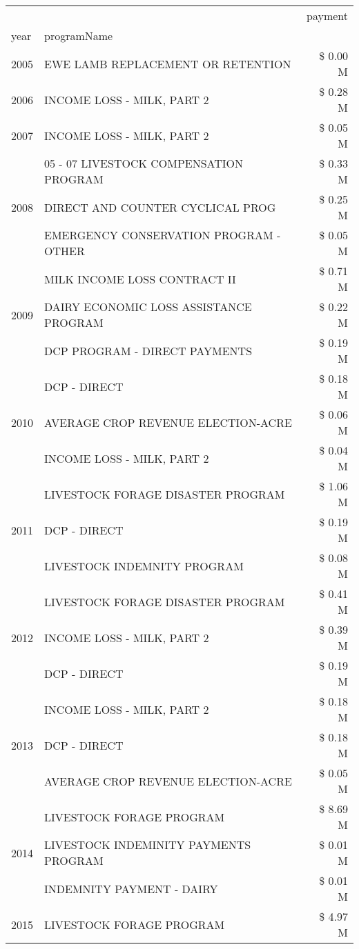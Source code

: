 \begin{tabular}{llr}
\toprule
 &  & payment \\
year & programName &  \\
\midrule
2005 & EWE LAMB REPLACEMENT OR RETENTION & \$ 0.00 M \\
\cline{1-3}
2006 & INCOME LOSS - MILK, PART 2 & \$ 0.28 M \\
\cline{1-3}
2007 & INCOME LOSS - MILK, PART 2 & \$ 0.05 M \\
\cline{1-3}
\multirow[t]{3}{*}{2008} & 05 - 07 LIVESTOCK COMPENSATION PROGRAM & \$ 0.33 M \\
 & DIRECT AND COUNTER CYCLICAL PROG & \$ 0.25 M \\
 & EMERGENCY CONSERVATION PROGRAM - OTHER & \$ 0.05 M \\
\cline{1-3}
\multirow[t]{3}{*}{2009} & MILK INCOME LOSS CONTRACT II & \$ 0.71 M \\
 & DAIRY ECONOMIC LOSS ASSISTANCE PROGRAM & \$ 0.22 M \\
 & DCP PROGRAM - DIRECT PAYMENTS & \$ 0.19 M \\
\cline{1-3}
\multirow[t]{3}{*}{2010} & DCP - DIRECT & \$ 0.18 M \\
 & AVERAGE CROP REVENUE ELECTION-ACRE & \$ 0.06 M \\
 & INCOME LOSS - MILK, PART 2 & \$ 0.04 M \\
\cline{1-3}
\multirow[t]{3}{*}{2011} & LIVESTOCK FORAGE DISASTER PROGRAM & \$ 1.06 M \\
 & DCP - DIRECT & \$ 0.19 M \\
 & LIVESTOCK INDEMNITY PROGRAM & \$ 0.08 M \\
\cline{1-3}
\multirow[t]{3}{*}{2012} & LIVESTOCK FORAGE DISASTER PROGRAM & \$ 0.41 M \\
 & INCOME LOSS - MILK, PART 2 & \$ 0.39 M \\
 & DCP - DIRECT & \$ 0.19 M \\
\cline{1-3}
\multirow[t]{3}{*}{2013} & INCOME LOSS - MILK, PART 2 & \$ 0.18 M \\
 & DCP - DIRECT & \$ 0.18 M \\
 & AVERAGE CROP REVENUE ELECTION-ACRE & \$ 0.05 M \\
\cline{1-3}
\multirow[t]{3}{*}{2014} & LIVESTOCK FORAGE PROGRAM & \$ 8.69 M \\
 & LIVESTOCK INDEMINITY PAYMENTS PROGRAM & \$ 0.01 M \\
 & INDEMNITY PAYMENT - DAIRY & \$ 0.01 M \\
\cline{1-3}
\multirow[t]{3}{*}{2015} & LIVESTOCK FORAGE PROGRAM & \$ 4.97 M \\

\end{tabular}
